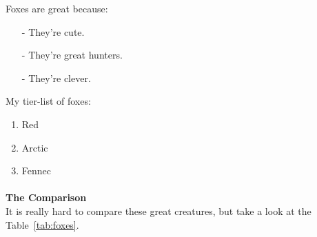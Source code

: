 Foxes are great because:
\begin{itemize}
  \item[-] They're cute.
  \item[-] They're great hunters.
  \item[-] They're clever.
\end{itemize}

My tier-list of foxes:
\begin{enumerate}
  \item Red
  \item Arctic
  \item Fennec
\end{enumerate}
\paragraph{}
\textbf{The Comparison}\\
It is really hard to compare these great creatures, but take a look at the Table~\ref{tab:foxes}.
